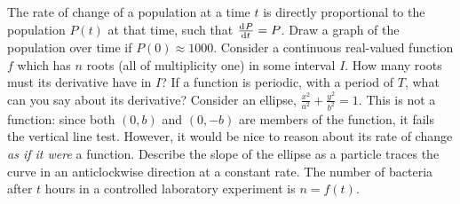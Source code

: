 \begin{questions}
  \questioM The rate of change of a population at a time $ t $ is directly proportional to the
            population $ P(t) $ at that time, such that $ \od{P}{t} = P $. Draw a graph of the
            population over time if $ P(0) \approx 1000 $.
  \questioM Consider a continuous real-valued function $ f $ which has $ n $ roots (all of multiplicity one) in some
            interval $ I $. How many roots must its derivative have in $ I $?
  \questioM If a function is periodic, with a period of $ T $, what can you say about its derivative?
  \questioM Consider an ellipse, $ \frac{x^2}{a^2} + \frac{y^2}{b^2} = 1 $. This is not a function: since both $ (0, b) $ and $ (0, -b) $ are
            members of the function, it fails the vertical line test. However, it would be nice to reason about its
            rate of change \textit{as if it were} a function. Describe the slope of the ellipse as a particle traces the curve in
            an anticlockwise direction at a constant rate.
  \questioM The number of bacteria after $ t $ hours in a controlled laboratory experiment is $ n = f(t) $.
\end{questions}

